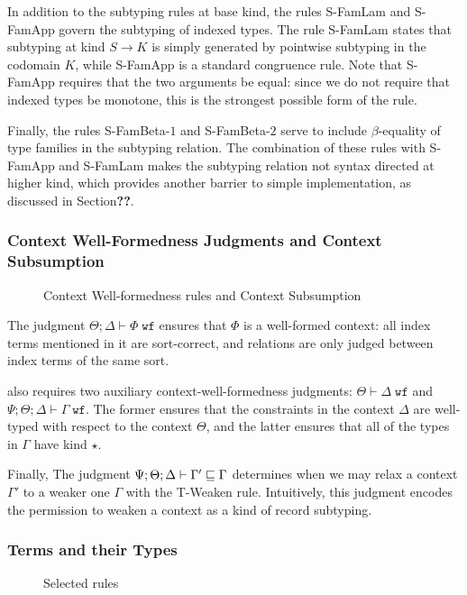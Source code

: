 In addition to the subtyping rules at base kind, the rules S-FamLam and S-FamApp govern the subtyping of indexed types. The rule S-FamLam states that subtyping at kind $S \to K$ is simply generated by pointwise subtyping in the codomain $K$, while S-FamApp is a standard congruence rule. Note that S-FamApp requires that the two arguments be equal: since we do not require that indexed types be monotone, this is the strongest possible form of the rule.

Finally, the rules S-FamBeta-$1$ and S-FamBeta-$2$ serve to include $\beta$-equality of type families in the subtyping relation. The combination of these rules with S-FamApp and S-FamLam makes the subtyping relation not syntax directed at higher kind, which provides another barrier to simple implementation, as discussed in Section\textbf{??}.

\subsubsection{Context Well-Formedness Judgments and Context Subsumption}
\begin{figure}

\caption{Context Well-formedness rules and Context Subsumption}
\label{fig:dlambdaamor-ctx-wf-rules}
\end{figure}
The judgment $\Theta ; \Delta \vdash \Phi \; \texttt{wf}$ ensures that $\Phi$ is a well-formed context: all index terms mentioned in it are sort-correct, and relations are only judged between index terms of the same sort.

\dlambdaamor also requires two auxiliary context-well-formedness judgments: $\Theta \vdash \Delta \; \texttt{wf}$ and $\Psi ; \Theta ; \Delta \vdash \Gamma \; \texttt{wf}$. The former ensures that the constraints in the context $\Delta$ are well-typed with respect to the context $\Theta$, and the latter ensures that all of the types in $\Gamma$ have kind $\star$.

Finally, The judgment $\Psi ; \Theta ; \Delta \vdash \Gamma' \sqsubseteq \Gamma$ determines when we may relax a context $\Gamma'$ to a weaker one $\Gamma$ with the T-Weaken rule. Intuitively, this judgment encodes the permission to weaken a context as a kind of record subtyping.


\subsubsection{Terms and their Types}
\begin{figure}

\caption{Selected \dlambdaamor rules}
\label{fig:dlambdaamor-selected-typing-rules}
\end{figure}

